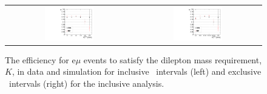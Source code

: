 \begin{figure}[!ht]
\begin{center}
\begin{tabular}{cc}
\includegraphics[width=0.4\textwidth]{plots/extractK_inclusive_92fb.pdf} &
\includegraphics[width=0.4\textwidth]{plots/extractK_exclusive_92fb.pdf} \\
\end{tabular}
\caption{\label{fig:K_incl}
The efficiency for e$\mu$ events to satisfy the dilepton mass requirement, $K$, in data and simulation for inclusive \MET\ intervals (left) and
exclusive \MET\ intervals (right) for the inclusive analysis. 
}

\end{center}
\end{figure}
